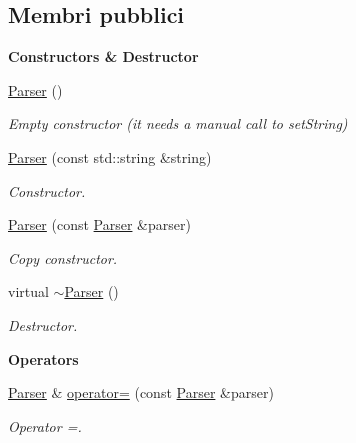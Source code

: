 \subsection*{Membri pubblici}
\begin{Indent}{\bf Constructors \& Destructor}\par
\begin{DoxyCompactItemize}
\item 
\hyperlink{classLifeV_1_1Parser_a439ecd746d503e75b6e07f2933a665dc}{Parser} ()
\begin{DoxyCompactList}\small\item\em Empty constructor (it needs a manual call to set\-String) \end{DoxyCompactList}\item 
\hyperlink{classLifeV_1_1Parser_a6acf25b7222f0c65d1414611236d1820}{Parser} (const std\-::string \&string)
\begin{DoxyCompactList}\small\item\em Constructor. \end{DoxyCompactList}\item 
\hyperlink{classLifeV_1_1Parser_a0f7c4d10928fd2139e76baf44996b610}{Parser} (const \hyperlink{classLifeV_1_1Parser}{Parser} \&parser)
\begin{DoxyCompactList}\small\item\em Copy constructor. \end{DoxyCompactList}\item 
virtual \hyperlink{classLifeV_1_1Parser_a34d16f77f23cf33b3bc3f8293ed0e2ed}{$\sim$\-Parser} ()
\begin{DoxyCompactList}\small\item\em Destructor. \end{DoxyCompactList}\end{DoxyCompactItemize}
\end{Indent}
\begin{Indent}{\bf Operators}\par
\begin{DoxyCompactItemize}
\item 
\hyperlink{classLifeV_1_1Parser}{Parser} \& \hyperlink{classLifeV_1_1Parser_a257904e57f46427a5bd7c9f80e658c2d}{operator=} (const \hyperlink{classLifeV_1_1Parser}{Parser} \&parser)
\begin{DoxyCompactList}\small\item\em Operator =. \end{DoxyCompactList}\end{DoxyCompactItemize}
\end{Indent}
